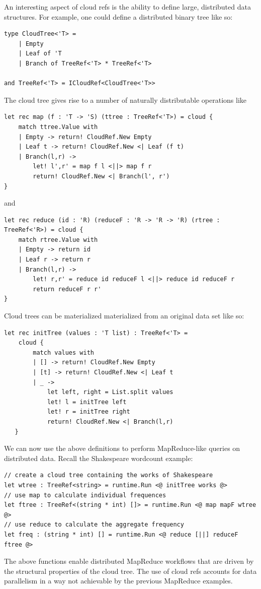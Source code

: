 \documentclass[9pt,a4paper]{article}
\begin{document}
An interesting aspect of cloud refs is the ability to define large, distributed
data structures. For example, one could define a distributed binary tree like so:
\begin{lstlisting}
type CloudTree<'T> = 
	| Empty
    | Leaf of 'T
	| Branch of TreeRef<'T> * TreeRef<'T>

and TreeRef<'T> = ICloudRef<CloudTree<'T>>
\end{lstlisting}
The cloud tree gives rise to a number of naturally distributable operations like
\begin{lstlisting}
let rec map (f : 'T -> 'S) (ttree : TreeRef<'T>) = cloud {
    match ttree.Value with
    | Empty -> return! CloudRef.New Empty
    | Leaf t -> return! CloudRef.New <| Leaf (f t)
    | Branch(l,r) ->
        let! l',r' = map f l <||> map f r
        return! CloudRef.New <| Branch(l', r')
}
\end{lstlisting}
and
\begin{lstlisting}
let rec reduce (id : 'R) (reduceF : 'R -> 'R -> 'R) (rtree : TreeRef<'R>) = cloud {
    match rtree.Value with
    | Empty -> return id
    | Leaf r -> return r
    | Branch(l,r) ->
        let! r,r' = reduce id reduceF l <||> reduce id reduceF r
        return reduceF r r'
}
\end{lstlisting}
Cloud trees can be materialized materialized from an original data set like so:
\begin{lstlisting}
let rec initTree (values : 'T list) : TreeRef<'T> =
    cloud {
        match values with
        | [] -> return! CloudRef.New Empty
        | [t] -> return! CloudRef.New <| Leaf t
        | _ ->
            let left, right = List.split values
            let! l = initTree left 
            let! r = initTree right
            return! CloudRef.New <| Branch(l,r)
   }
\end{lstlisting}
We can now use the above definitions to perform MapReduce-like queries on distributed data.
Recall the Shakespeare wordcount example:
\begin{lstlisting}
// create a cloud tree containing the works of Shakespeare
let wtree : TreeRef<string> = runtime.Run <@ initTree works @>
// use map to calculate individual frequences
let ftree : TreeRef<(string * int) []> = runtime.Run <@ map mapF wtree @>
// use reduce to calculate the aggregate frequency
let freq : (string * int) [] = runtime.Run <@ reduce [||] reduceF ftree @>
\end{lstlisting}
The above functions enable distributed MapReduce workflows that are 
driven by the structural properties of the cloud tree.
The use of cloud refs accounts for data parallelism in a way not achievable
by the previous MapReduce examples.
\end{document}
